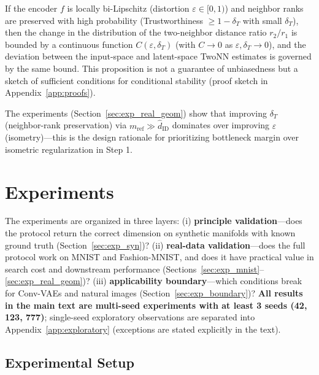 \documentclass[make,article,submit,pdftex,moreauthors]{Definitions/mdpi}
\newcommand{\hatdID}{\hat{d}_{\mathrm{ID}}}
\begin{document}
\begin{Proposition}\label{thm:twonn_stability}
If the encoder $f$ is locally bi-Lipschitz (distortion
$\varepsilon \in [0,1)$) and neighbor ranks are preserved with high
probability (Trustworthiness $\geq 1 - \delta_T$ with small $\delta_T$),
then the change in the distribution of the two-neighbor distance ratio
$r_2/r_1$ is bounded by a continuous function $C(\varepsilon, \delta_T)$
(with $C \to 0$ as $\varepsilon, \delta_T \to 0$), and the deviation between
the input-space and latent-space TwoNN estimates is governed by the same
bound.
This proposition is not a guarantee of unbiasedness but a sketch of
sufficient conditions for conditional stability (proof sketch in
Appendix~\ref{app:proofs}).
\end{Proposition}

The experiments (Section~\ref{sec:exp_real_geom}) show that improving
$\delta_T$ (neighbor-rank preservation) via $m_{\mathrm{ref}} \gg \hatdID$
dominates over improving $\varepsilon$ (isometry)---this is the design
rationale for prioritizing bottleneck margin over isometric regularization
in Step 1.

\section{Experiments}\label{sec:exp}

The experiments are organized in three layers:
(i) \textbf{principle validation}---does the protocol return the correct
dimension on synthetic manifolds with known ground truth
(Section~\ref{sec:exp_syn})?
(ii) \textbf{real-data validation}---does the full protocol work on MNIST
and Fashion-MNIST, and does it have practical value in search cost and
downstream performance
(Sections~\ref{sec:exp_mnist}--\ref{sec:exp_real_geom})?
(iii) \textbf{applicability boundary}---which conditions break for
Conv-VAEs and natural images (Section~\ref{sec:exp_boundary})?
\textbf{All results in the main text are multi-seed experiments with at
least 3 seeds (42, 123, 777)}; single-seed exploratory observations are
separated into Appendix~\ref{app:exploratory} (exceptions are stated
explicitly in the text).

\subsection{Experimental Setup}\label{sec:exp_setup}
\end{document}
